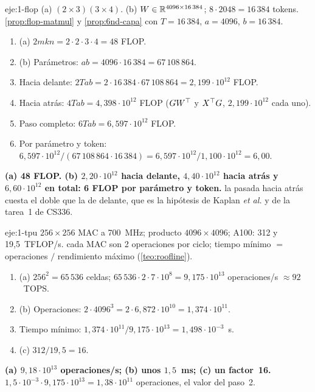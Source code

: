\begin{solucion}{eje:1-flop}
\datos (a) $(2\times 3)(3\times 4)$. (b) $W\in\mathbb{R}^{4096\times 16\,384}$; $8\cdot 2048=16\,384$ tokens.
\planteamiento \cref{prop:flop-matmul} y \cref{prop:6nd-capa} con $T=16\,384$, $a=4096$, $b=16\,384$.
\pasos
\begin{enumerate}[label=\arabic*.]
  \item (a) $2mkn=2\cdot 2\cdot 3\cdot 4=48$ FLOP.
  \item (b) Parámetros: $ab=4096\cdot 16\,384=67\,108\,864$.
  \item Hacia delante: $2Tab=2\cdot 16\,384\cdot 67\,108\,864=2{,}199\cdot 10^{12}$ FLOP.
  \item Hacia atrás: $4Tab=4{,}398\cdot 10^{12}$ FLOP ($GW^{\top}$ y $X^{\top} G$, $2{,}199\cdot 10^{12}$ cada uno).
  \item Paso completo: $6Tab=6{,}597\cdot 10^{12}$ FLOP.
  \item Por parámetro y token: $6{,}597\cdot 10^{12}/(67\,108\,864\cdot 16\,384)=6{,}597\cdot 10^{12}/1{,}100\cdot 10^{12}=6{,}00$.
\end{enumerate}
\resultado \textbf{(a) 48 FLOP. (b) $2{,}20\cdot 10^{12}$ hacia delante, $4{,}40\cdot 10^{12}$ hacia atrás y $6{,}60\cdot 10^{12}$ en total: 6 FLOP por parámetro y token.}
\comprobacion la pasada hacia atrás cuesta el doble que la de delante, que es la hipótesis de Kaplan \emph{et al.} y de la tarea~1 de CS336.
\end{solucion}

\begin{solucion}{eje:1-tpu}
\datos $256\times 256$ MAC a 700~MHz; producto $4096\times 4096$; A100: 312 y 19{,}5~TFLOP/s.
\planteamiento cada MAC son 2 operaciones por ciclo; tiempo mínimo $=$ operaciones $/$ rendimiento máximo (\cref{teo:roofline}).
\pasos
\begin{enumerate}[label=\arabic*.]
  \item (a) $256^{2}=65\,536$ celdas; $65\,536\cdot 2\cdot 7\cdot 10^{8}=9{,}175\cdot 10^{13}$ operaciones/s $\approx 92$~TOPS.
  \item (b) Operaciones: $2\cdot 4096^{3}=2\cdot 6{,}872\cdot 10^{10}=1{,}374\cdot 10^{11}$.
  \item Tiempo mínimo: $1{,}374\cdot 10^{11}/9{,}175\cdot 10^{13}=1{,}498\cdot 10^{-3}$~s.
  \item (c) $312/19{,}5=16$.
\end{enumerate}
\resultado \textbf{(a) $9{,}18\cdot 10^{13}$ operaciones/s; (b) unos $1{,}5$~ms; (c) un factor~16.}
\comprobacion $1{,}5\cdot 10^{-3}\cdot 9{,}175\cdot 10^{13}=1{,}38\cdot 10^{11}$ operaciones, el valor del paso~2.
\end{solucion}

